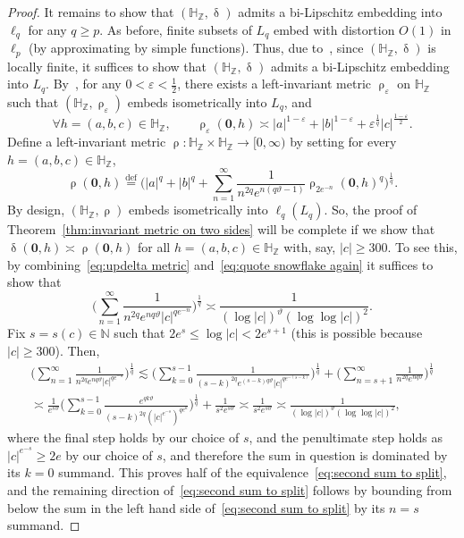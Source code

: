 \documentclass[11pt,reqno]{amsart}
\renewcommand{\H}{\mathbb{H}}
\newcommand{\N}{\mathbb{N}}
\newcommand{\Z}{\mathbb{Z}}
\newcommand{\e}{\varepsilon}
\newcommand{\0}{\mathbf{0}}
\renewcommand{\1}{\mathbf 1}
\newcommand{\from}{\colon}
\newcommand{\eqdef}{\stackrel{\mathrm{def}}{=}}
\renewcommand{\ge}{\geqslant}
\renewcommand{\le}{\leqslant}
\theoremstyle{remark}
\begin{document}
\begin{proof}
It remains to show that $(\H_\Z,\updelta)$ admits a bi-Lipschitz embedding into $\ell_q$ for any $q\ge p$. As before, finite subsets of $L_q$ embed with distortion $O(1)$ in $\ell_p$ (by approximating by simple functions). Thus, due to~\cite{Ost12}, since $(\H_\Z,\updelta)$ is locally finite, it suffices to show  that $(\H_\Z,\updelta)$ admits a bi-Lipschitz embedding into $L_q$. By~\cite[Lemma~3.1]{LN14}, for any $0<\e<\frac{1}{2}$, there exists a left-invariant metric $\uprho_\e$ on $\H_\Z$ such that $(\H_\Z,\uprho_\e)$ embeds isometrically into $L_q$, and
\begin{equation}\label{eq:quote snowflake again}
\forall h=(a,b,c)\in \H_\Z,\qquad \uprho_\e(\0,h)\asymp |a|^{1-\e}+|b|^{1-\e}+\e^{\frac{1}{q}} |c|^{\frac{1-\e}{2}}.
\end{equation}
Define a left-invariant metric $\uprho\from \H_\Z\times \H_\Z\to [0,\infty)$  by setting for every $h=(a,b,c)\in \H_\Z$,
$$
\uprho(\0,h)\eqdef \bigg(|a|^q+|b|^q+\sum_{n=1}^\infty \frac{1}{n^{2q}e^{n(q\vartheta-1) }}\uprho_{2e^{-n}}(\0,h)^q \bigg)^{\frac{1}{q}}.
$$
By design, $(\H_\Z,\uprho)$ embeds isometrically into $\ell_q(L_q)$. So, the proof of Theorem~\ref{thm:invariant metric on two sides} will be complete if we show that $\updelta(\0,h)\asymp \uprho(\0,h)$ for all $h=(a,b,c)\in \H_\Z$ with, say, $|c|\ge 300$. To see this, by combining~\eqref{eq:updelta metric} and~\eqref{eq:quote snowflake again} it suffices to show that
\begin{equation}\label{eq:second sum to split}
\bigg(\sum_{n=1}^\infty \frac{1}{n^{2q}e^{nq\vartheta}|c|^{qe^{-n}}}\bigg)^{\frac{1}{q}}\asymp \frac{1}{(\log |c|)^\vartheta (\log\log |c|)^2}.
\end{equation}
Fix $s=s(c)\in \N$ such that $2e^{s}\le \log |c|<2e^{s+1}$ (this is possible because $|c|\ge 300$). Then,
\begin{multline*}
\bigg(\sum_{n=1}^\infty \frac{1}{n^{2q}e^{nq\vartheta}|c|^{qe^{-n}}}\bigg)^{\frac{1}{q}}\lesssim \bigg(\sum_{k=0}^{s-1}\frac{1}{(s-k)^{2q}e^{(s-k)q\vartheta}|c|^{qe^{-(s-k)}}}\bigg)^{\frac{1}{q}} +\bigg(\sum_{n=s+1}^\infty \frac{1}{n^{2q}e^{nq\vartheta}}\bigg)^{\frac{1}{q}}\\\asymp \frac{1}{e^{s\vartheta}}\bigg(\sum_{k=0}^{s-1}\frac{e^{qk\vartheta}}{(s-k)^{2q}(|c|^{e^{-s}})^{qe^k}}\bigg)^{\frac{1}{q}} +\frac{1}{s^2e^{s\vartheta}}\asymp \frac{1}{s^2e^{s\vartheta}}\asymp \frac{1}{(\log |c|)^\vartheta (\log\log |c|)^2},
\end{multline*}
where the final step holds by our choice of $s$, and the penultimate step holds as $|c|^{e^{-s}}\ge 2e$ by our choice of $s$, and therefore the sum in question is dominated by its $k=0$ summand. This proves half of the equivalence~\eqref{eq:second sum to split}, and the remaining direction of~\eqref{eq:second sum to split} follows by bounding from below the sum in the left hand side of~\eqref{eq:second sum to split} by its $n=s$ summand.
\end{proof}
\end{document}

